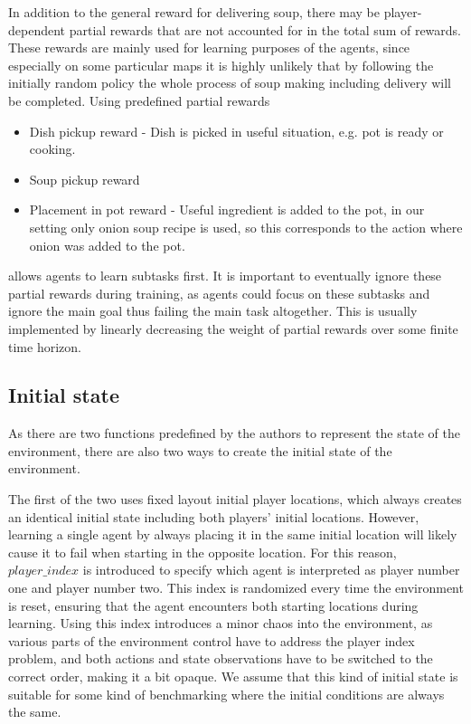 In addition to the general reward for delivering soup, there may be player-dependent partial rewards that are not accounted for in the total sum of rewards.
These rewards are mainly used for learning purposes of the agents, since especially on some particular maps it is highly unlikely that by following the initially random policy the whole process of soup making including delivery will be completed.
Using predefined partial rewards
\begin{itemize}
    \item Dish pickup reward - Dish is picked in useful situation, e.g. pot is ready or cooking.
    \item Soup pickup reward 
    \item Placement in pot reward - Useful ingredient is added to the pot, in our setting only onion soup recipe is used, so this corresponds to the action where onion was added to the pot.
\end{itemize}
allows agents to learn subtasks first.
It is important to eventually ignore these partial rewards during training, as agents could focus on these subtasks and ignore the main goal thus failing the main task altogether.
This is usually implemented by linearly decreasing the weight of partial rewards over some finite time horizon.


\subsection{Initial state}
As there are two functions predefined by the authors to represent the state of the environment, there are also two ways to create the initial state of the environment.

The first of the two uses fixed layout initial player locations, which always creates an identical initial state including both players' initial locations.
However, learning a single agent by always placing it in the same initial location will likely cause it to fail when starting in the opposite location.
For this reason, $player\_index$ is introduced to specify which agent is interpreted as player number one and player number two.
This index is randomized every time the environment is reset, ensuring that the agent encounters both starting locations during learning.
Using this index introduces a minor chaos into the environment, as various parts of the environment control have to address the player index problem, and both actions and state observations have to be switched to the correct order, making it a bit opaque.
We assume that this kind of initial state is suitable for some kind of benchmarking where the initial conditions are always the same.

